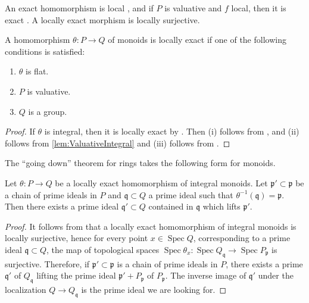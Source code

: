 \documentclass[10pt]{amsart}
\DeclareMathOperator{\Spec}{Spec}
\begin{document}
An exact homomorphism is local \cite[Proposition I.2.1.16 (2)]{Ogu}, and if $P$ is valuative and $f$ local, then it is exact \cite[Proposition I.4.2.1 (4)]{Ogu}. A locally exact morphism is locally surjective. 

\begin{lemma}\label{lem:locallyexact}
A homomorphism $\theta \colon P \to Q$ of monoids is locally exact if one of the following conditions is satisfied:
\begin{enumerate}
\item[(i)] $\theta$ is flat.
\item[(ii)] $P$ is valuative.
\item[(iii)] $Q$ is a group.
\end{enumerate}
\end{lemma}
\begin{proof}
If $\theta$ is integral, then it is locally exact by \cite[Proposition I.4.6.3 (4)]{Ogu}. Then (i) follows from \cite[Proposition I.4.6.7]{Ogu}, and (ii) follows from \cref{lem:ValuativeIntegral} and (iii) follows from \cite[Proposition I.4.6.3 (5)]{Ogu}. 
\end{proof}

The ``going down'' theorem for rings \cite[Tag 00HS]{stacks-project} takes the following form for monoids.
 
\begin{proposition}\label{prop:goingdown}
Let $\theta \colon P \to Q$ be a locally exact homomorphism of integral monoids. Let $\mathfrak{p}' \subset \mathfrak{p}$ be a chain of prime ideals in $P$ and $\mathfrak{q} \subset Q$ a prime ideal such that $\theta^{-1}(\mathfrak{q}) = \mathfrak{p}.$ Then there exists a prime ideal $\mathfrak{q}' \subset Q$ contained in $\mathfrak{q}$ which lifts $\mathfrak{p}'$.
\end{proposition}
\begin{proof}
It follows from \cite[Proposition I.4.2.2]{Ogu} that a locally exact homomorphism of integral monoids is locally surjective, hence for every point $x \in \Spec{Q}$, corresponding to a prime ideal $\mathfrak{q} \subset Q$, the map of topological spaces $\Spec{\theta}_{x} \colon \Spec{Q_{\mathfrak{q}}} \to \Spec{P_\mathfrak{p}}$ is surjective. Therefore, if $\mathfrak{p}' \subset \mathfrak{p}$ is a chain of prime ideals in $P$, there exists a prime $\mathfrak{q}'$ of $Q_\mathfrak{q}$ lifting the prime ideal $\mathfrak{p}'+P_\mathfrak{p}$ of $P_\mathfrak{p}.$ The inverse image of $\mathfrak{q}'$ under the localization $Q \to Q_{\mathfrak{q}}$ is the prime ideal we are looking for.
\end{proof}
\end{document}
